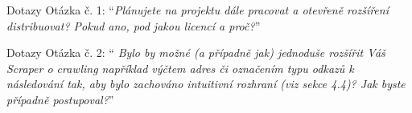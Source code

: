 \documentclass[czech,aspectratio=169]{beamer}
\makeatletter
\def\beamer@writeslidentry@miniframesoff{%
	\expandafter\beamer@ifempty\expandafter{\beamer@framestartpage}{}%
	{%
		\clearpage\beamer@notesactions%
	}
}
\newcommand*{\miniframesoff}{\let\beamer@writeslidentry=\beamer@writeslidentry@miniframesoff}
\makeatother
\begin{document}
	\miniframesoff
	\begin{frame}[noframenumbering]{Dotazy}
		Otázka č. 1: \enquote{\textit{Plánujete na projektu dále pracovat a otevřeně rozšíření distribuovat? Pokud ano, pod jakou licencí a proč?}}
	\end{frame}

	\begin{frame}[noframenumbering]{Dotazy}
		Otázka č. 2: \enquote{\textit{ Bylo by možné (a případně jak) jednoduše rozšířit Váš Scraper o crawling například výčtem adres či označením typu odkazů k následování tak, aby bylo zachováno intuitivní rozhraní (viz sekce 4.4)? Jak byste případně postupoval?}}
	\end{frame}
\end{document}
